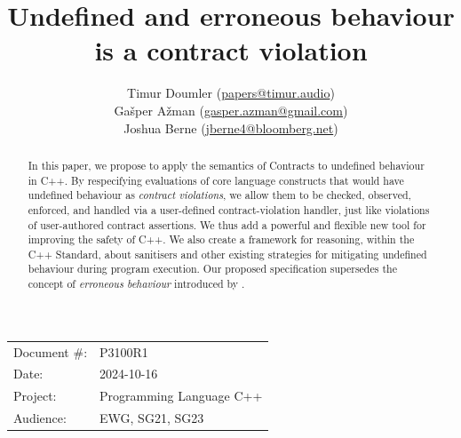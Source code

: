 

 \usepackage[bottom]{footmisc} 

 \usepackage{longtable}


\usepackage{tikz,lipsum,lmodern}
\usepackage[most]{tcolorbox}



\usepackage{titlesec}
\usepackage{tocloft}


\newcommand{\changelocaltocdepth}[1]{%
  \addtocontents{toc}{\protect\setcounter{tocdepth}{#1}}%
  \setcounter{tocdepth}{#1}%
}

\setcounter{tocdepth}{3}



\title{Undefined and erroneous behaviour is a contract violation}
\author{ Timur Doumler \small(\href{mailto:papers@timur.audio}{papers@timur.audio})  \\
Ga\v sper A\v zman \small(\href{mailto:gasper.azman@gmail.com}{gasper.azman@gmail.com})   \\
Joshua Berne \small(\href{mailto:jberne4@bloomberg.net}{jberne4@bloomberg.net})  
}
\date{}
\maketitle

\begin{tabular}{ll}
Document \#: & P3100R1 \\
Date: &2024-10-16 \\
Project: & Programming Language C++ \\
Audience: & EWG, SG21, SG23
\end{tabular}

\begin{abstract}
In this paper, we propose to apply the semantics of Contracts \cite{P2900R9} to undefined behaviour in C++. By respecifying evaluations of core language constructs that would have undefined behaviour as \emph{contract violations}, we allow them to be checked, observed, enforced, and handled via a user-defined contract-violation handler, just like violations of user-authored contract assertions. We thus add a powerful and flexible new tool for improving the safety of C++. We also create a framework for reasoning, within the C++ Standard, about sanitisers and other existing strategies for mitigating undefined behaviour during program execution. Our proposed specification supersedes the concept of \emph{erroneous behaviour} introduced by \cite{P2795R5}.
\end{abstract}

